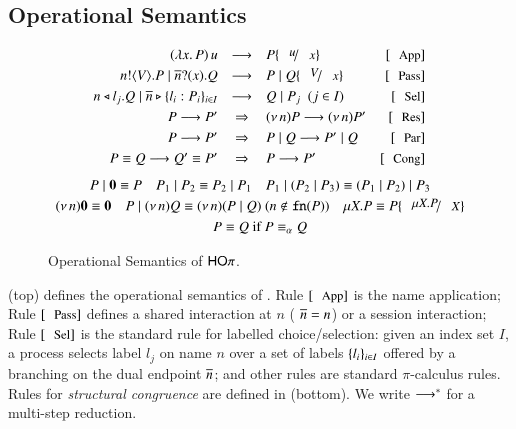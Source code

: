\subsection{Operational Semantics}
\label{subsec:semantics}

\begin{figure}
\[
	\begin{array}{rclrcrclr}
		(\abs{x}{P}) \, u  & \red & P \subst{u}{x} 
		& \orule{App}
		\\[1mm]

		\bout{n}{V} P \Par \binp{\dual{n}}{x} Q & \red & P \Par Q \subst{V}{x} 
		& \orule{Pass}
		\\[1mm]

		\bsel{n}{l_j} Q \Par \bbra{\dual{n}}{l_i : P_i}_{i \in I} & \red & Q \Par P_j ~~(j \in I)~~ 
		& \orule{Sel}
		\\[1mm]

		P \red P' & \Rightarrow & \news{n} P  \red  \news{n} P' 
		& \orule{Res}
		\\[1mm]

		P \red P' & \Rightarrow  &  P \Par Q  \red   P' \Par Q  
		& \orule{Par}
		\\[1mm]

		P \scong Q \red Q' \scong P' & \Rightarrow & P  \red  P'
		& \orule{Cong}
	\end{array}
\]
{\small
\[
	\begin{array}{c}
		P \Par \inact \scong P
		\quad
		P_1 \Par P_2 \scong P_2 \Par P_1
		\quad
		P_1 \Par (P_2 \Par P_3) \scong (P_1 \Par P_2) \Par P_3
		\\[1mm]
		\news{n} \inact \scong \inact
		\quad 
		P \Par \news{n} Q \scong \news{n}(P \Par Q)
		\	(n \notin \fn{P})\quad 
		\recp{X}{P} \scong P\subst{\recp{X}{P}}{\rvar{X}}
		\\[1mm]
		P \scong Q \textrm{ if } P \scong_\alpha Q
	\end{array}
\]
}
\caption{Operational Semantics of $\mathsf{HO}\pi$. 
\label{fig:reduction}}
\Hlinefig
\end{figure}
\noindent {} (top) defines the operational semantics 
of \HOp.
Rule $\orule{App}$ is the name application; 
Rule $\orule{Pass}$ defines a shared interaction at $n$ 
( $\overline{n}=n$) or a session interaction;  
Rule $\orule{Sel}$ is the standard rule for labelled choice/selection:
given an index set $I$, 
a process selects label $l_j$ on name $n$ over a set of
labels $\{l_i\}_{i \in I}$ offered by a branching 
on the dual endpoint $\overline{n}$; and other rules are standard
$\pi$-calculus rules.
Rules for \emph{structural congruence} are defined in  (bottom). 
We write $\longrightarrow^\ast$ for a multi-step reduction. 
